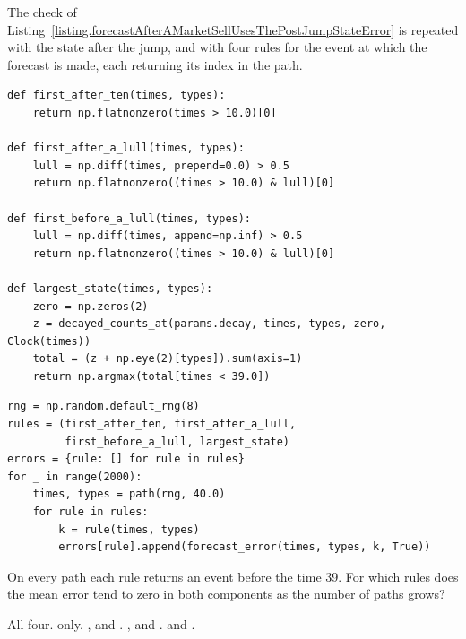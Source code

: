 \begin{question}
\label{question.forecastFromAStoppingTime}
The check of Listing~\ref{listing.forecastAfterAMarketSellUsesThePostJumpStateError}
is repeated with the state after the jump,
and with four rules for the event at which the forecast is made,
each returning its index in the path.
\begin{lstlisting}[caption={Four rules for the time of the forecast}, label=listing.forecastFromAStoppingTimeRules]
def first_after_ten(times, types):
    return np.flatnonzero(times > 10.0)[0]

def first_after_a_lull(times, types):
    lull = np.diff(times, prepend=0.0) > 0.5
    return np.flatnonzero((times > 10.0) & lull)[0]

def first_before_a_lull(times, types):
    lull = np.diff(times, append=np.inf) > 0.5
    return np.flatnonzero((times > 10.0) & lull)[0]

def largest_state(times, types):
    zero = np.zeros(2)
    z = decayed_counts_at(params.decay, times, types, zero, Clock(times))
    total = (z + np.eye(2)[types]).sum(axis=1)
    return np.argmax(total[times < 39.0])
\end{lstlisting}
\begin{lstlisting}[caption={The errors at the four times}, label=listing.forecastFromAStoppingTimeRun]
rng = np.random.default_rng(8)
rules = (first_after_ten, first_after_a_lull,
         first_before_a_lull, largest_state)
errors = {rule: [] for rule in rules}
for _ in range(2000):
    times, types = path(rng, 40.0)
    for rule in rules:
        k = rule(times, types)
        errors[rule].append(forecast_error(times, types, k, True))
\end{lstlisting}
On every path each rule returns an event before the time 39.
For which rules does the mean error tend to zero in both components
as the number of paths grows?
\begin{choices}
 \choice All four.
 \choice {} only.
 \choice {},  and .
 \choice {},  and .
 \correctchoice {} and .
\end{choices}
\end{question}

